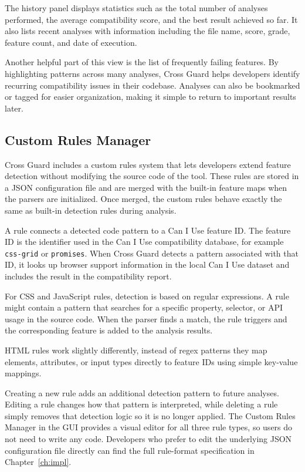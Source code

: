 The history panel displays statistics such as the total number of analyses performed, the average compatibility score, and the best result achieved so far. It also lists recent analyses with information including the file name, score, grade, feature count, and date of execution.

Another helpful part of this view is the list of frequently failing features. By highlighting patterns across many analyses, Cross Guard helps developers identify recurring compatibility issues in their codebase. Analyses can also be bookmarked or tagged for easier organization, making it simple to return to important results later.

\subsection{Custom Rules Manager}

Cross Guard includes a custom rules system that lets developers extend feature detection without modifying the source code of the tool. These rules are stored in a JSON configuration file and are merged with the built-in feature maps when the parsers are initialized. Once merged, the custom rules behave exactly the same as built-in detection rules during analysis.

A rule connects a detected code pattern to a Can I Use feature ID. The feature ID is the identifier used in the Can I Use compatibility database, for example \texttt{css-grid} or \texttt{promises}. When Cross Guard detects a pattern associated with that ID, it looks up browser support information in the local Can I Use dataset and includes the result in the compatibility report.

For CSS and JavaScript rules, detection is based on regular expressions. A rule might contain a pattern that searches for a specific property, selector, or API usage in the source code. When the parser finds a match, the rule triggers and the corresponding feature is added to the analysis results.

HTML rules work slightly differently, instead of regex patterns they map elements, attributes, or input types directly to feature IDs using simple key-value mappings.

Creating a new rule adds an additional detection pattern to future analyses. Editing a rule changes how that pattern is interpreted, while deleting a rule simply removes that detection logic so it is no longer applied. The Custom Rules Manager in the GUI provides a visual editor for all three rule types, so users do not need to write any code. Developers who prefer to edit the underlying JSON configuration file directly can find the full rule-format specification in Chapter~\ref{ch:impl}.

